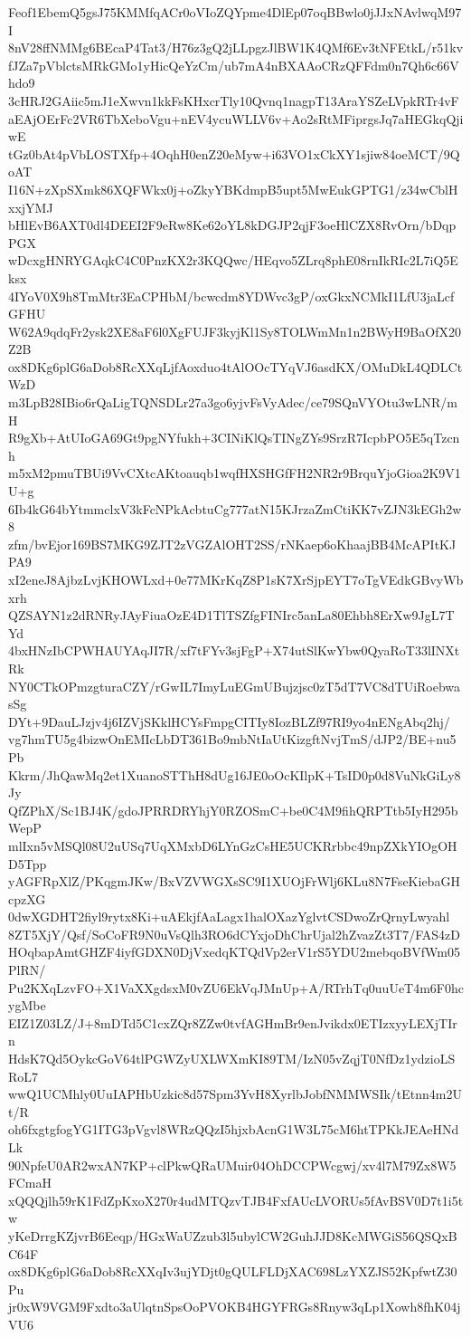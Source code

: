 Feof1EbemQ5gsJ75KMMfqACr0oVIoZQYpme4DlEp07oqBBwlo0jJJxNAvlwqM97I
8nV28ffNMMg6BEcaP4Tat3/H76z3gQ2jLLpgzJlBW1K4QMf6Ev3tNFEtkL/r51kv
fJZa7pVblctsMRkGMo1yHicQeYzCm/ub7mA4nBXAAoCRzQFFdm0n7Qh6c66Vhdo9
3cHRJ2GAiic5mJ1eXwvn1kkFsKHxcrTly10Qvnq1nagpT13AraYSZeLVpkRTr4vF
aEAjOErFc2VR6TbXeboVgu+nEV4ycuWLLV6v+Ao2sRtMFiprgsJq7aHEGkqQjiwE
tGz0bAt4pVbLOSTXfp+4OqhH0enZ20eMyw+i63VO1xCkXY1sjiw84oeMCT/9QoAT
I16N+zXpSXmk86XQFWkx0j+oZkyYBKdmpB5upt5MwEukGPTG1/z34wCblHxxjYMJ
bHlEvB6AXT0dl4DEEI2F9eRw8Ke62oYL8kDGJP2qjF3oeHlCZX8RvOrn/bDqpPGX
wDcxgHNRYGAqkC4C0PnzKX2r3KQQwc/HEqvo5ZLrq8phE08rnIkRIc2L7iQ5Eksx
4IYoV0X9h8TmMtr3EaCPHbM/bcwcdm8YDWvc3gP/oxGkxNCMkI1LfU3jaLcfGFHU
W62A9qdqFr2ysk2XE8aF6l0XgFUJF3kyjKl1Sy8TOLWmMn1n2BWyH9BaOfX20Z2B
ox8DKg6plG6aDob8RcXXqLjfAoxduo4tAlOOcTYqVJ6asdKX/OMuDkL4QDLCtWzD
m3LpB28IBio6rQaLigTQNSDLr27a3go6yjvFsVyAdec/ce79SQnVYOtu3wLNR/mH
R9gXb+AtUIoGA69Gt9pgNYfukh+3CINiKlQsTINgZYs9SrzR7IcpbPO5E5qTzcnh
m5xM2pmuTBUi9VvCXtcAKtoauqb1wqfHXSHGfFH2NR2r9BrquYjoGioa2K9V1U+g
6Ib4kG64bYtmmclxV3kFcNPkAcbtuCg777atN15KJrzaZmCtiKK7vZJN3kEGh2w8
zfm/bvEjor169BS7MKG9ZJT2zVGZAlOHT2SS/rNKaep6oKhaajBB4McAPItKJPA9
xI2eneJ8AjbzLvjKHOWLxd+0e77MKrKqZ8P1sK7XrSjpEYT7oTgVEdkGBvyWbxrh
QZSAYN1z2dRNRyJAyFiuaOzE4D1TlTSZfgFINIrc5anLa80Ehbh8ErXw9JgL7TYd
4bxHNzIbCPWHAUYAqJI7R/xf7tFYv3sjFgP+X74utSlKwYbw0QyaRoT33lINXtRk
NY0CTkOPmzgturaCZY/rGwIL7ImyLuEGmUBujzjsc0zT5dT7VC8dTUiRoebwasSg
DYt+9DauLJzjv4j6IZVjSKklHCYsFmpgCITIy8IozBLZf97RI9yo4nENgAbq2hj/
vg7hmTU5g4bizwOnEMIcLbDT361Bo9mbNtIaUtKizgftNvjTmS/dJP2/BE+nu5Pb
Kkrm/JhQawMq2et1XuanoSTThH8dUg16JE0oOcKIlpK+TsID0p0d8VuNkGiLy8Jy
QfZPhX/Sc1BJ4K/gdoJPRRDRYhjY0RZOSmC+be0C4M9fihQRPTtb5IyH295bWepP
mlIxn5vMSQl08U2uUSq7UqXMxbD6LYnGzCsHE5UCKRrbbc49npZXkYIOgOHD5Tpp
yAGFRpXlZ/PKqgmJKw/BxVZVWGXsSC9I1XUOjFrWlj6KLu8N7FseKiebaGHcpzXG
0dwXGDHT2fiyl9rytx8Ki+uAEkjfAaLagx1halOXazYglvtCSDwoZrQrnyLwyahl
8ZT5XjY/Qsf/SoCoFR9N0uVsQlh3RO6dCYxjoDhChrUjal2hZvazZt3T7/FAS4zD
HOqbapAmtGHZF4iyfGDXN0DjVxedqKTQdVp2erV1rS5YDU2mebqoBVfWm05PlRN/
Pu2KXqLzvFO+X1VaXXgdsxM0vZU6EkVqJMnUp+A/RTrhTq0uuUeT4m6F0hcygMbe
EIZ1Z03LZ/J+8mDTd5C1cxZQr8ZZw0tvfAGHmBr9enJvikdx0ETIzxyyLEXjTIrn
HdsK7Qd5OykcGoV64tlPGWZyUXLWXmKI89TM/IzN05vZqjT0NfDz1ydzioLSRoL7
wwQ1UCMhly0UuIAPHbUzkic8d57Spm3YvH8XyrlbJobfNMMWSIk/tEtnn4m2Ut/R
oh6fxgtgfogYG1ITG3pVgvl8WRzQQzI5hjxbAcnG1W3L75cM6htTPKkJEAeHNdLk
90NpfeU0AR2wxAN7KP+clPkwQRaUMuir04OhDCCPWcgwj/xv4l7M79Zx8W5FCmaH
xQQQjlh59rK1FdZpKxoX270r4udMTQzvTJB4FxfAUcLVORUs5fAvBSV0D7t1i5tw
yKeDrrgKZjvrB6Eeqp/HGxWaUZzub3l5ubylCW2GuhJJD8KcMWGiS56QSQxBC64F
ox8DKg6plG6aDob8RcXXqIv3ujYDjt0gQULFLDjXAC698LzYXZJS52KpfwtZ30Pu
jr0xW9VGM9Fxdto3aUlqtnSpsOoPVOKB4HGYFRGs8Rnyw3qLp1Xowh8fhK04jVU6
